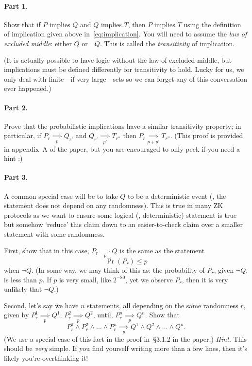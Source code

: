 \documentclass[12pt]{article}
\newcommand{\impliesn}[1]{\underset{#1}{\implies}}
\newcommand{\impliesp}{\impliesn{p}}
\newcommand{\impliespp}{\impliesn{p'}}
\begin{document}
\paragraph{Part 1.} Show that if $P$ implies $Q$ and $Q$ implies $T$, then $P$
implies $T$ using the definition of implication given
above in~\eqref{eq:implication}. You will need to assume the \emph{law of
excluded middle}: either $Q$ or $\neg Q$. This is called the \emph{transitivity}
of implication.

(It is actually possible to have logic without the law of excluded middle, but
implications must be defined differently for transitivity to hold. Lucky for
us, we only deal with finite---if very large---sets so we can forget any of
this conversation ever happened.)

\paragraph{Part 2.} Prove that the probabilistic implications have a similar
transitivity property; in particular, if $P_r \impliesp Q_{r'}$ and $Q_{r'}
\impliespp T_{r''}$ then $P_r \impliesn{p + p'} T_{r''}$. (This proof is
provided in appendix~A of the paper, but you are encouraged to only peek if you
need a hint :)

\paragraph{Part 3.} A common special case will be to take $Q$ to be a
deterministic event (\ie, the statement does not depend on any randomness).
This is true in many ZK protocols as we want to ensure some logical (\ie,
deterministic) statement is true but somehow `reduce' this claim down to an
easier-to-check claim over a smaller statement with some randomness.

First, show that in this case, $P_r \impliesp Q$ is the same as the statement
\[
    \Pr(P_r) \le p
\]
when $\neg Q$. (In some way, we may think of this as: the probability of $P_r$,
given $\neg Q$, is less than $p$. If $p$ is very small, like $2^{-80}$, yet we
observe $P_r$, then it is very unlikely that $\neg Q$.)

Second, let's say we have $n$ statements, all depending on the same randomness
$r$, given by $P_r^1 \impliesp Q^1$, $P_r^2 \impliesp Q^2$, until, $P_r^n
\impliesp Q^n$. Show that
\[
    P_r^1 \wedge P_r^2 \wedge \dots \wedge P_r^n \impliesp Q^1 \wedge Q^2 \wedge \dots \wedge Q^n.
\]
(We use a special case of this fact in the proof in~\S3.1.2 in the paper.)
\emph{Hint.} This should be \emph{very} simple. If you find yourself writing more
than a few lines, then it's likely you're overthinking it!
\end{document}
